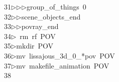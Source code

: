 \begin{tabbing}
31\>$\triangleright$\>$\triangleright$\>$\triangleright$\>group\_of\_things\ 0\ \\[0pt]
32\>$\triangleright$\>$\triangleright$\>scene\_objects\_end\ \\[0pt]
33\>$\triangleright$\>$\triangleright$\>povray\_end\\[0pt]
34\>$\triangleright$\>\ rm\ rf\ POV\\[0pt]
35\>$\triangleright$\>mkdir\ POV\\[0pt]
36\>$\triangleright$\>mv\ lissajous\_3d\_0\_*pov\ POV\\[0pt]
37\>$\triangleright$\>mv\ makefile\_animation\ POV\\[0pt]
38\>\end{tabbing}
